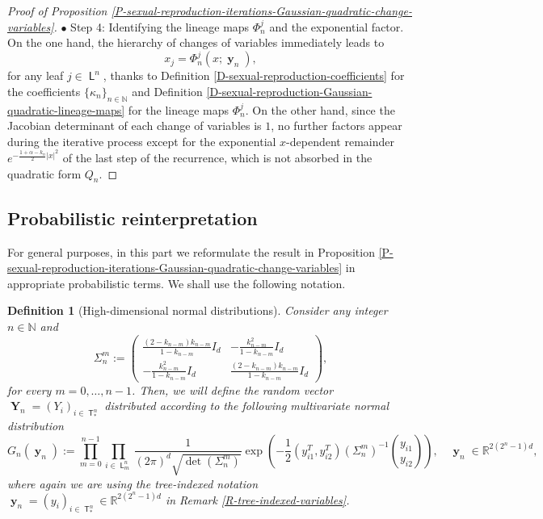 \documentclass[reqno]{amsart}
\newtheorem{definition}{Definition}[section]
\DeclareMathOperator{\Tree}{\mathsf{T}}
\DeclareMathOperator{\Leaves}{\mathsf{L}}
\DeclareMathOperator{\Level}{\mathsf{L}}
\DeclareMathOperator{\by}{\mathbf{y}}
\DeclareMathOperator{\bY}{\mathbf{Y}}
\numberwithin{equation}{section}
\begin{document}
{\begin{proof}[Proof of Proposition \ref{P-sexual-reproduction-iterations-Gaussian-quadratic-change-variables}]
\medskip

$\bullet$ {\sc Step 4}: Identifying the lineage maps $\Phi_n^j$ and the exponential factor.\\
On the one hand, the hierarchy of changes of variables immediately leads to
$$x_j=\Phi_n^j(x;\by_n),$$
for any leaf $j\in \Leaves^n$, thanks to Definition \ref{D-sexual-reproduction-coefficients} for the coefficients $\{\kappa_n\}_{n\in \mathbb{N}}$ and Definition \ref{D-sexual-reproduction-Gaussian-quadratic-lineage-maps} for the lineage maps $\Phi_n^j$. On the other hand, since the Jacobian determinant of each change of variables is $1$, no further factors appear during the iterative process except for the exponential $x$-dependent remainder $e^{-\frac{1+\alpha-k_n}{2}\vert x\vert^2}$ of the last step of the recurrence, which is not absorbed in the quadratic form $Q_n$.
\end{proof}


\subsection{Probabilistic reinterpretation}

For general purposes, in this part we reformulate the result in Proposition \ref{P-sexual-reproduction-iterations-Gaussian-quadratic-change-variables} in appropriate probabilistic terms. We shall use the following notation.

\begin{definition}[High-dimensional normal distributions]\label{D-sexual-reproduction-multivariate-normal-Gn}
Consider any integer $n\in \mathbb{N}$ and
\begin{equation}\label{E-sexual-reproduction-multivariate-normal-Gn-covariances}
\Sigma_n^m:=\left(\begin{array}{cc}
\displaystyle \frac{(2-k_{n-m})k_{n-m}}{1-k_{n-m}} I_d & \displaystyle-\frac{k_{n-m}^2}{1-k_{n-m}} I_d\\
\displaystyle-\frac{k_{n-m}^2}{1-k_{n-m}} I_d & \displaystyle\frac{(2-k_{n-m})k_{n-m}}{1-k_{n-m}} I_d
\end{array}\right),
\end{equation}
for every $m=0,\ldots,n-1$. Then, we will define the random vector $\bY_n=(Y_i)_{i\in \Tree^n_*}$ distributed according to the following multivariate normal distribution
\begin{equation}\label{E-sexual-reproduction-multivariate-normal-Gn}
G_n(\by_n):=\prod_{m=0}^{n-1}\prod_{i\in \Level_m^n}\frac{1}{(2\pi)^d\sqrt{\det(\Sigma_n^m)}}\exp\left(-\frac{1}{2}(y_{i1}^T,y_{i2}^T)(\Sigma_n^m)^{-1}\binom{y_{i1}}{y_{i2}}\right),\quad \by_n\in\mathbb{R}^{2(2^n-1)d},
\end{equation}
where again we are using the tree-indexed notation $\by_n=(y_i)_{i\in \Tree^n_*}\in \mathbb{R}^{2(2^n-1)d}$ in Remark \ref{R-tree-indexed-variables}.
\end{definition}

}
\end{document}
